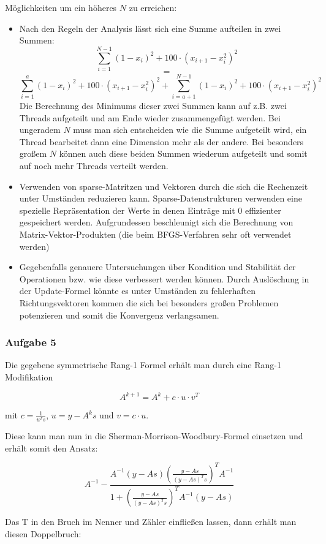 \documentclass[a4paper, 12pt]{report}
\begin{document}
Möglichkeiten um ein höheres $N$ zu erreichen:
\begin{itemize}
  \item Nach den Regeln der Analysis lässt sich eine Summe aufteilen in zwei Summen:
  $$\sum_{i=1}^{N-1}(1 - x_i)^2 + 100\cdot(x_{i+1}-x_i^2)^2$$
  $$=$$
  $$\sum_{i=1}^{a}(1 - x_i)^2 + 100\cdot(x_{i+1}-x_i^2)^2 + \sum_{i=a+1}^{N-1}(1 - x_i)^2 + 100\cdot(x_{i+1}-x_i^2)^2$$
  Die Berechnung des Minimums dieser zwei Summen kann auf z.B. zwei Threads aufgeteilt und am Ende wieder zusammengefügt werden.
  Bei ungeradem $N$ muss man sich entscheiden wie die Summe aufgeteilt wird, ein Thread bearbeitet dann eine Dimension mehr als der andere.
  Bei besonders großem $N$ können auch diese beiden Summen wiederum aufgeteilt und somit auf noch mehr Threads verteilt werden.
  \item Verwenden von sparse-Matritzen und Vektoren durch die sich die Rechenzeit unter Umständen reduzieren kann. Sparse-Datenstrukturen
  verwenden eine spezielle Repräsentation der Werte in denen Einträge mit $0$ effizienter gespeichert werden. Aufgrundessen beschleunigt
  sich die Berechnung von Matrix-Vektor-Produkten (die beim BFGS-Verfahren sehr oft verwendet werden)
  \item Gegebenfalls genauere Untersuchungen über Kondition und Stabilität der Operationen bzw. wie diese verbessert werden können.
  Durch Auslöschung in der Update-Formel könnte es unter Umständen zu fehlerhaften Richtungsvektoren kommen die sich bei besonders
  großen Problemen potenzieren und somit die Konvergenz verlangsamen.
\end{itemize}

\subsubsection{Aufgabe 5}

Die gegebene symmetrische Rang-1 Formel erhält man durch eine Rang-1 Modifikation

$$A^{k + 1} = A^k + c\cdot u\cdot v^T$$

mit $c = \frac{1}{u^Ts}$, $u = y - A^ks$ und $v = c\cdot u$.

Diese kann man nun in die Sherman-Morrison-Woodbury-Formel einsetzen und erhält somit den Ansatz:

$$ A^{-1} - \frac{ A^{-1}(y-As)\left(\frac{ y-As }{ (y-As)^Ts } \right)^TA^{-1} }{1 + \left(\frac{ y-As }{ (y-As)^Ts }\right)^TA^{-1}(y-As)}$$

Das T in den Bruch im Nenner und Zähler einfließen lassen, dann erhält man diesen Doppelbruch:
\end{document}
